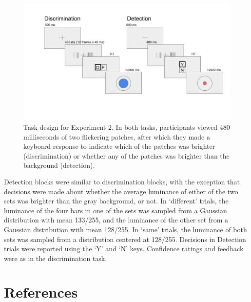 \documentclass[
  english,
  man]{apa6}
\begin{document}
\begin{figure}
\includegraphics[width=\textwidth]{figures/designExp2} \caption[Experimental design for Exp. 2]{Task design for Experiment 2. In both tasks, participants viewed 480 milliseconds of two flickering patches, after which they made a keyboard response to indicate which of the patches was brighter (discrimination) or whether any of the patches was brighter than the background (detection). }\label{fig:RC-exp2-design}
\end{figure}

Detection blocks were similar to discrimination blocks, with the exception that decisions were made about whether the average luminance of either of the two sets was brighter than the gray background, or not. In `different' trials, the luminance of the four bars in one of the sets was sampled from a Gaussian distribution with mean 133/255, and the luminance of the other set from a Gaussian distribution with mean 128/255. In `same' trials, the luminance of both sets was sampled from a distribution centered at 128/255. Decisions in Detection trials were reported using the `Y' and `N' keys. Confidence ratings and feedback were as in the discrimination task.

\hypertarget{references}{%
\section{References}\label{references}}

\begingroup
\setlength{\parindent}{-0.5in}
\setlength{\leftskip}{0.5in}
\end{document}
